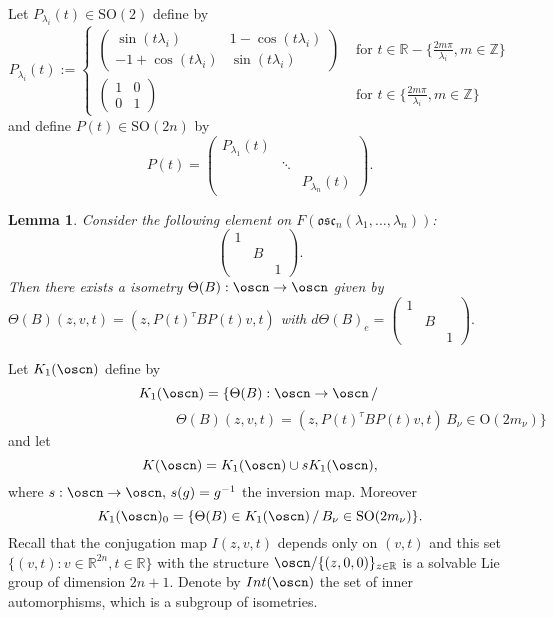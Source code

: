 \documentclass[11pt]{amsart}
\theoremstyle{plain}
\newtheorem{lem}[thm]{Lemma}
\theoremstyle{definition}
\theoremstyle{remark}
\begin{document}
Let $P_{\lambda_i}(t)\in \mathrm{SO}(2)$ define by
$$P_{\lambda_i}(t):=\left\{
	 \begin{array}{cl}
\left( \begin{matrix}
	\sin(t\lambda_i) & 1 -\cos(t\lambda_i)\\
-1 +\cos(t\lambda_i)  & \sin(t\lambda_i)
\end{matrix}\right) & \mbox{ for } t\in \mathbb R -\{\frac{2m\pi}{\lambda_i}, m\in \mathbb Z\}\\
 \left( \begin{matrix}
1 &0\\
0  & 1
\end{matrix}\right) & \mbox{ for } t\in\{\frac{2m\pi}{\lambda_i}, m\in \mathbb Z\}
\end{array}	
\right.
$$
and define $P(t)\in \mathrm{SO}(2n)$ by
$$P(t)=\left( \begin{matrix}
P_{\lambda_1}(t) & & \\
& \ddots & \\
& & P_{\lambda_n}(t)
\end{matrix}\right).$$

\begin{lem} Consider the following element on $F(\mathfrak{osc}_n(\lambda_1, \hdots, \lambda_n))$:
	$$\left( \begin{matrix}
	1 & & \\
	& B & \\
	& & 1
	\end{matrix}\right).$$
Then there exists a isometry $\Theta(B):\oscn \to \oscn$ given by
$\Theta(B)(z,v,t)=(z, P(t)^{\tau}BP(t)v, t)$ with $d \Theta(B)_e=\left( \begin{matrix}
1 & & \\
& B & \\
& & 1
\end{matrix}\right).$
\end{lem}

Let $K_1(\oscn)$ define by
$$K_1(\oscn)=\{\Theta(B):\oscn \to \oscn \,  /\,$$
$$\qquad \qquad \qquad  \qquad \qquad \qquad \Theta(B)(z,v,t)=(z,P(t)^{\tau}BP(t)v,t)\, B_{\nu}\in\mathrm{O}(2m_{\nu})\}$$
and let $$K(\oscn)=K_1(\oscn)\cup sK_1(\oscn),$$
where $s:\oscn \to \oscn, \, s(g)=g^{-1}$ the inversion map.
Moreover 
$$K_1(\oscn)_0=\{\Theta(B)\in K_1(\oscn)\,/\, B_{\nu}\in \mathrm{SO}(2m_{\nu})\}.$$
Recall that the conjugation map $I{(z,v,t)}$ depends only on $(v,t)$ and this set $\{(v,t): v \in \mathbb R^{2n}, t\in \mathbb R\}$ with the structure $\oscn/\{(z,0,0)\}_{z\in\mathbb R}$ is a solvable Lie group of dimension $2n+1$. Denote by $Int(\oscn)$ the set of inner automorphisms, which is a subgroup of isometries. 
\end{document}
